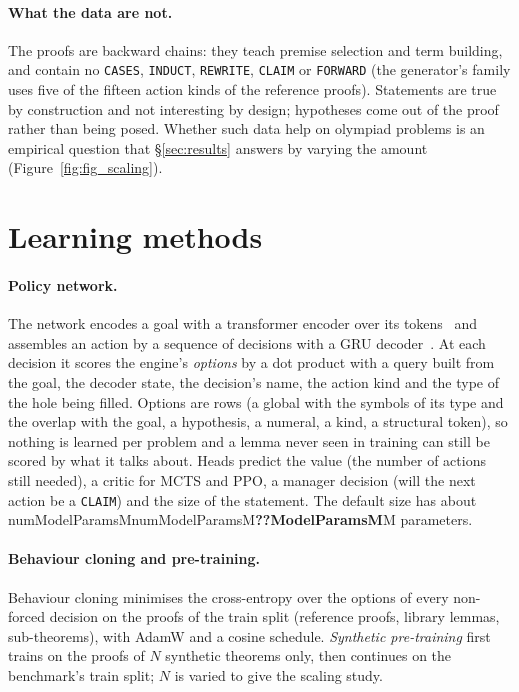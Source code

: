 \documentclass[10pt]{article}
\newcommand{\N}[1]{\ifcsname num#1\endcsname\csname num#1\endcsname\else\textbf{??#1}\fi}          %
\newcommand{\code}[1]{\texttt{#1}}
\begin{document}
\paragraph{What the data are not.}
The proofs are backward chains: they teach premise selection and term building, and contain no \code{CASES}, \code{INDUCT}, \code{REWRITE}, \code{CLAIM} or \code{FORWARD} (the generator's family uses five of the fifteen action kinds of the reference proofs). Statements are true by construction and not interesting by design; hypotheses come out of the proof rather than being posed. Whether such data help on olympiad problems is an empirical question that \S\ref{sec:results} answers by varying the amount (Figure~\ref{fig:fig_scaling}).

\section{Learning methods}\label{sec:methods}

\paragraph{Policy network.}
The network encodes a goal with a transformer encoder over its tokens~\citep{vaswani2017attention} and assembles an action by a sequence of decisions with a GRU decoder~\citep{cho2014learning}. At each decision it scores the engine's \emph{options} by a dot product with a query built from the goal, the decoder state, the decision's name, the action kind and the type of the hole being filled.
Options are rows (a global with the symbols of its type and the overlap with the goal, a hypothesis, a numeral, a kind, a structural token), so nothing is learned per problem and a lemma never seen in training can still be scored by what it talks about. Heads predict the value (the number of actions still needed), a critic for MCTS and PPO, a manager decision (will the next action be a \code{CLAIM}) and the size of the statement. The default size has about \N{ModelParamsM}M parameters.

\paragraph{Behaviour cloning and pre-training.}
Behaviour cloning minimises the cross-entropy over the options of every non-forced decision on the proofs of the train split (reference proofs, library lemmas, sub-theorems), with AdamW and a cosine schedule. \emph{Synthetic pre-training} first trains on the proofs of $N$ synthetic theorems only, then continues on the benchmark's train split; $N$ is varied to give the scaling study.
\end{document}
